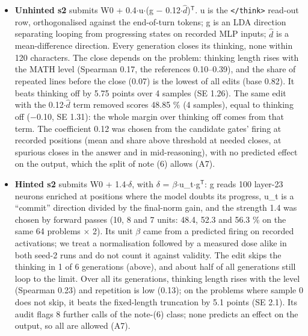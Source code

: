 \documentclass[
  10pt,
]{article}
\newcommand{\passthrough}[1]{#1}
\newcounter{none} %
\providecommand{\tightlist}{%
  \setlength{\itemsep}{0pt}\setlength{\parskip}{0pt}}
\begin{document}
\begin{itemize}
\tightlist
\item
  \textbf{Unhinted s2} submits W0 + 0.4\ensuremath{\cdot}u\ensuremath{\cdot}(g \ensuremath{-} 0.12\ensuremath{\cdot}\ensuremath{\hat{d}})\ensuremath{^{\mathsf{T}}}. u is the
  \passthrough{\lstinline!</think>!} read-out row, orthogonalised
  against the end-of-turn tokens; g is an LDA direction separating
  looping from progressing states on recorded MLP inputs; \ensuremath{\hat{d}} is a
  mean-difference direction. Every generation closes its thinking, none
  within 120 characters. The close depends on the problem: thinking
  length rises with the MATH level (Spearman 0.17, the references
  0.10--0.39), and the share of repeated lines before the close (0.07)
  is the lowest of all edits (base 0.82). It beats thinking off by 5.75
  points over 4 samples (SE 1.26). The same edit with the 0.12\ensuremath{\cdot}\ensuremath{\hat{d}} term
  removed scores 48.85 \% (4 samples), equal to thinking off (\ensuremath{-}0.10, SE
  1.31): the whole margin over thinking off comes from that term. The
  coefficient 0.12 was chosen from the candidate gates' firing at
  recorded positions (mean and share above threshold at needed closes,
  at spurious closes in the answer and in mid-reasoning), with no
  predicted effect on the output, which the split of note (6) allows
  (A7).
\item
  \textbf{Hinted s2} submits W0 + 1.4\ensuremath{\cdot}\ensuremath{\delta}, with \ensuremath{\delta} = \ensuremath{\beta}\ensuremath{\cdot}u\_t\ensuremath{\cdot}g\ensuremath{^{\mathsf{T}}}: g reads 100
  layer-23 neurons enriched at positions where the model doubts its
  progress, u\_t is a ``commit'' direction divided by the final-norm
  gain, and the strength 1.4 was chosen by forward passes (10, 8 and 7
  units: 48.4, 52.3 and 56.3 \% on the same 64 problems \ensuremath{\times} 2). Its unit \ensuremath{\beta}
  came from a predicted firing on recorded activations; we treat a
  normalisation followed by a measured dose alike in both seed-2 runs
  and do not count it against validity. The edit skips the thinking in 1
  of 6 generations (above), and about half of all generations still loop
  to the limit. Over all its generations, thinking length rises with the
  level (Spearman 0.23) and repetition is low (0.13); on the problems
  where sample 0 does not skip, it beats the fixed-length truncation by
  5.1 points (SE 2.1). Its audit flags 8 further calls of the note-(6)
  class; none predicts an effect on the output, so all are allowed (A7).
\end{itemize}
\end{document}
